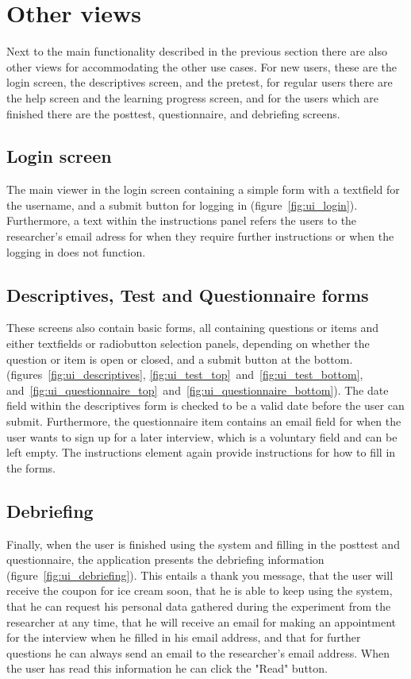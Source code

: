 \section{Other views}

Next to the main functionality described in the previous section there are also other views for accommodating the other use cases. For new users, these are the login screen, the descriptives screen, and the pretest, for regular users there are the help screen and the learning progress screen, and for the users which are finished there are the posttest, questionnaire, and debriefing screens.

\subsection{Login screen}

The main viewer in the login screen containing a simple form with a textfield for the username, and a submit button for logging in (figure~\ref{fig:ui_login}). Furthermore, a text within the instructions panel refers the users to the researcher's email adress for when they require further instructions or when the logging in does not function.

\subsection{Descriptives, Test and Questionnaire forms}

These screens also contain basic forms, all containing questions or items and either textfields or radiobutton selection panels, depending on whether the question or item is open or closed, and a submit button at the bottom. (figures~\ref{fig:ui_descriptives}, \ref{fig:ui_test_top}~and~\ref{fig:ui_test_bottom}, and~\ref{fig:ui_questionnaire_top}~and~\ref{fig:ui_questionnaire_bottom}). The date field within the descriptives form is checked to be a valid date before the user can submit. Furthermore, the questionnaire item contains an email field for when the user wants to sign up for a later interview, which is a voluntary field and can be left empty. The instructions element again provide instructions for how to fill in the forms.

\subsection{Debriefing}

Finally, when the user is finished using the system and filling in the posttest and questionnaire, the application presents the debriefing information (figure~\ref{fig:ui_debriefing}). This entails a thank you message, that the user will receive the coupon for ice cream soon, that he is able to keep using the system, that he can request his personal data gathered during the experiment from the researcher at any time, that he will receive an email for making an appointment for the interview when he filled in his email address, and that for further questions he can always send an email to the researcher's email address. When the user has read this information he can click the "Read" button.

